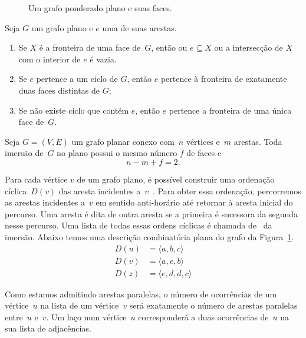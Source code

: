 \begin{figure}[htb]
\scalebox{1.5}{
\centering

}
\caption{Um grafo ponderado plano e suas faces.}
\label{fig:MSF-basico-0}
\end{figure}



\begin{theorem}
Seja $G$ um grafo plano e $e$ uma de suas arestas.
\begin{enumerate}
\item Se $X$ é a fronteira de uma face de~$G$, então ou $e\subseteq X$ ou a intersecção de $X$ com o interior de $e$ é vazia.
\item Se $e$ pertence a um ciclo de $G$, então $e$ pertence à fronteira de exatamente duas faces distintas de $G$;
\item Se não existe ciclo que contém $e$, então $e$ pertence a fronteira de uma única face de~$G$.
\end{enumerate}
\end{theorem}



\begin{theorem}
\label{teo:MSFEuler}
Seja $G=(V,E)$ um grafo planar conexo com~$n$ vértices e~$m$ arestas. Toda imersão de~$G$ no plano possui o mesmo número $f$ de faces e
$$
n-m+f = 2.
$$
\end{theorem}

Para cada vértice $v$ de um grafo plano, é possível construir uma ordenação cíclica~$D(v)$ das aresta incidentes a~$v$~\cite{noma2003}.
Para obter essa ordenação, percorremos as arestas incidentes a~$v$ em sentido anti-horário até retornar à aresta inicial do percurso.
Uma aresta é dita  de outra aresta se a primeira é sucessora da segunda nesse percurso.
Uma lista de todas essas ordens cíclicas é chamada de~ da imersão.
Abaixo temos uma descrição combinatória plana do grafo da Figura~\ref{fig:MSF-basico-0}.
\begin{align*}
D(u)&=\langle a, b, c\rangle\\
D(v)&=\langle a, e, b  \rangle\\
D(z)&=\langle e, d, d, c\rangle
\end{align*}

Como estamos admitindo arestas paralelas, o número de ocorrências de um vértice~$u$ na lista de um vértice~$v$ será exatamente o número de arestas paralelas entre~$u$ e~$v$.
Um laço num vértice~$u$ corresponderá a duas ocorrências de~$u$ na sua lista de adjacências.

